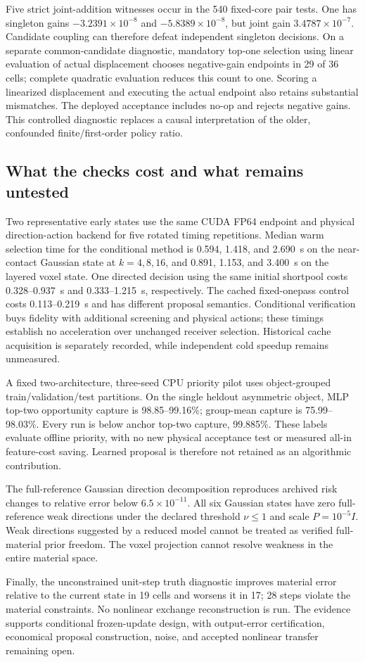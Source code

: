 Five strict joint-addition witnesses occur in the 540 fixed-core pair tests. One has singleton gains $-3.2391\times10^{-8}$ and $-5.8389\times10^{-8}$, but joint gain $3.4787\times10^{-7}$. Candidate coupling can therefore defeat independent singleton decisions. On a separate common-candidate diagnostic, mandatory top-one selection using linear evaluation of actual displacement chooses negative-gain endpoints in 29 of 36 cells; complete quadratic evaluation reduces this count to one. Scoring a linearized displacement and executing the actual endpoint also retains substantial mismatches. The deployed acceptance includes no-op and rejects negative gains. This controlled diagnostic replaces a causal interpretation of the older, confounded finite/first-order policy ratio.

\subsection{What the checks cost and what remains untested}
Two representative early states use the same CUDA FP64 endpoint and physical direction-action backend for five rotated timing repetitions. Median warm selection time for the conditional method is 0.594, 1.418, and 2.690~s on the near-contact Gaussian state at $k=4,8,16$, and 0.891, 1.153, and 3.400~s on the layered voxel state. One directed decision using the same initial shortpool costs 0.328--0.937~s and 0.333--1.215~s, respectively. The cached fixed-onepass control costs 0.113--0.219~s and has different proposal semantics. Conditional verification buys fidelity with additional screening and physical actions; these timings establish no acceleration over unchanged receiver selection. Historical cache acquisition is separately recorded, while independent cold speedup remains unmeasured.

A fixed two-architecture, three-seed CPU priority pilot uses object-grouped train/validation/test partitions. On the single heldout asymmetric object, MLP top-two opportunity capture is 98.85--99.16\%; group-mean capture is 75.99--98.03\%. Every run is below anchor top-two capture, 99.885\%. These labels evaluate offline priority, with no new physical acceptance test or measured all-in feature-cost saving. Learned proposal is therefore not retained as an algorithmic contribution.

The full-reference Gaussian direction decomposition reproduces archived risk changes to relative error below $6.5\times10^{-11}$. All six Gaussian states have zero full-reference weak directions under the declared threshold $\nu\le1$ and scale $P=10^{-5}I$. Weak directions suggested by a reduced model cannot be treated as verified full-material prior freedom. The voxel projection cannot resolve weakness in the entire material space.

Finally, the unconstrained unit-step truth diagnostic improves material error relative to the current state in 19 cells and worsens it in 17; 28 steps violate the material constraints. No nonlinear exchange reconstruction is run. The evidence supports conditional frozen-update design, with output-error certification, economical proposal construction, noise, and accepted nonlinear transfer remaining open.
